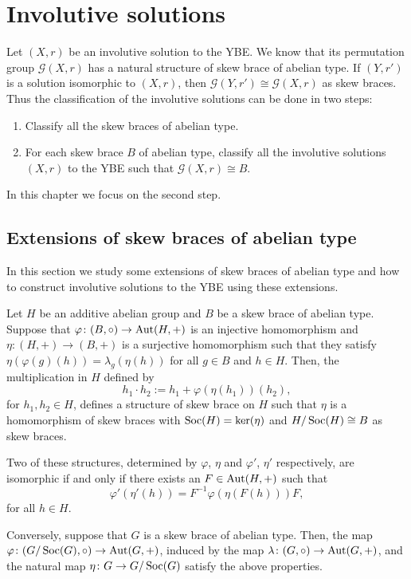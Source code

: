 \chapter{Involutive solutions}
\label{Isolutions}



Let $(X,r)$ be an involutive solution to the YBE. We know that its permutation group $\mathcal{G}(X,r)$ has a natural structure of skew brace of abelian type. If $(Y,r')$ is a solution isomorphic to $(X,r)$, then $\mathcal{G}(Y,r')\cong\mathcal{G}(X,r)$ as skew braces. Thus the classification of the involutive solutions can be done in two steps:
\begin{enumerate}
	\item Classify all the skew braces of abelian type.
	\item For each skew brace $B$ of abelian type, classify all the involutive solutions $(X,r)$ to the YBE such that $\mathcal{G}(X,r)\cong B$.
\end{enumerate}

In this chapter we focus on the second step. 

\section{Extensions of skew braces of abelian type}

In this section we study some extensions of skew braces of abelian type and how to construct involutive solutions to the YBE using these extensions.

\begin{proposition}\label{extensions}  Let $H$ be an additive abelian group and $B$
	be a skew brace of abelian type. Suppose  that $\varphi\colon
	(B,\circ)\to\operatorname{Aut}(H,+)$ is an injective homomorphism and
	$\eta\colon (H,+)\to (B,+)$ is a surjective homomorphism
	such that they satisfy $\eta(\varphi(g)(h))=\lambda_g(\eta(h))$ for
	all $g\in B$ and $h\in H$. Then, the multiplication in $H$ defined
	by
	$$h_1\cdot h_2:=h_1+\varphi(\eta (h_1))(h_2),$$
	for $h_1,h_2\in H$, defines a structure of skew brace on $H$
	such that $\eta$ is a homomorphism of skew braces  with
	$\operatorname{Soc}(H)=\ker(\eta)$ and $H/\operatorname{Soc}(H)\cong B$ as skew braces.
	
	Two of these structures, determined by $\varphi$, $\eta$ and
	$\varphi'$, $\eta'$ respectively, are isomorphic if and only if there
	exists an $F\in \operatorname{Aut}(H,+)$ such that
	$$
	\varphi'(\eta'(h))=F^{-1}\varphi(\eta(F(h))) F,
	$$
	for all $h\in H$.
	
	Conversely, suppose that $G$ is a skew brace of abelian type. Then, the map
	$\varphi\colon (G/\operatorname{Soc}(G),\circ)\to\operatorname{Aut}(G,+)$, induced by
	the map $\lambda\colon (G,\circ)\to\operatorname{Aut}(G,+)$, and the
	natural map $\eta\colon G\to G/\operatorname{Soc}(G)$ satisfy the
	above properties. 
\end{proposition}

